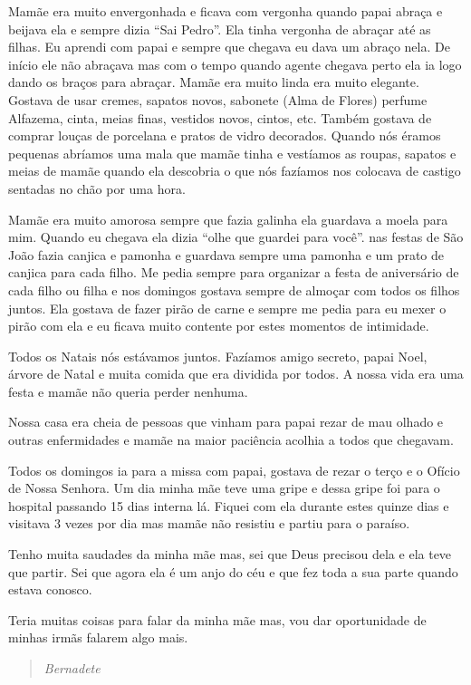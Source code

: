 \documentclass[
  brazil,
  a6paper,
  oneside,
  landscape,
  14pt]{scrbook}
\begin{document}
Mamãe era muito envergonhada e ficava com vergonha quando papai abraça e
beijava ela e sempre dizia ``Sai Pedro''. Ela tinha vergonha de abraçar
até as filhas. Eu aprendi com papai e sempre que chegava eu dava um
abraço nela. De início ele não abraçava mas com o tempo quando agente
chegava perto ela ia logo dando os braços para abraçar. Mamãe era muito
linda era muito elegante. Gostava de usar cremes, sapatos novos,
sabonete (Alma de Flores) perfume Alfazema, cinta, meias finas, vestidos
novos, cintos, etc. Também gostava de comprar louças de porcelana e
pratos de vidro decorados. Quando nós éramos pequenas abríamos uma mala
que mamãe tinha e vestíamos as roupas, sapatos e meias de mamãe quando
ela descobria o que nós fazíamos nos colocava de castigo sentadas no
chão por uma hora.

Mamãe era muito amorosa sempre que fazia galinha ela guardava a moela
para mim. Quando eu chegava ela dizia ``olhe que guardei para você''.
nas festas de São João fazia canjica e pamonha e guardava sempre uma
pamonha e um prato de canjica para cada filho. Me pedia sempre para
organizar a festa de aniversário de cada filho ou filha e nos domingos
gostava sempre de almoçar com todos os filhos juntos. Ela gostava de
fazer pirão de carne e sempre me pedia para eu mexer o pirão com ela e
eu ficava muito contente por estes momentos de intimidade.

Todos os Natais nós estávamos juntos. Fazíamos amigo secreto, papai
Noel, árvore de Natal e muita comida que era dividida por todos. A nossa
vida era uma festa e mamãe não queria perder nenhuma.

Nossa casa era cheia de pessoas que vinham para papai rezar de mau
olhado e outras enfermidades e mamãe na maior paciência acolhia a todos
que chegavam.

Todos os domingos ia para a missa com papai, gostava de rezar o terço e
o Ofício de Nossa Senhora. Um dia minha mãe teve uma gripe e dessa gripe
foi para o hospital passando 15 dias interna lá. Fiquei com ela durante
estes quinze dias e visitava 3 vezes por dia mas mamãe não resistiu e
partiu para o paraíso.

Tenho muita saudades da minha mãe mas, sei que Deus precisou dela e ela
teve que partir. Sei que agora ela é um anjo do céu e que fez toda a sua
parte quando estava conosco.

Teria muitas coisas para falar da minha mãe mas, vou dar oportunidade de
minhas irmãs falarem algo mais.

\begin{quote}
\emph{Bernadete}
\end{quote}
\end{document}
